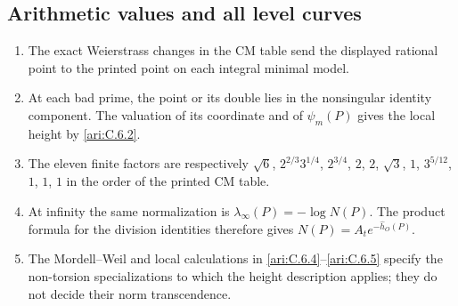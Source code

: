 \subsection{Arithmetic values and all level curves}
\RungOne
\begin{enumerate}[label=\arabic*.]
\item The exact Weierstrass changes in the CM table
send the displayed rational point to the printed
point on each integral minimal model.
\item At each bad prime, the point or its double
lies in the nonsingular identity component. The
valuation of its coordinate and of $\psi_m(P)$ gives
the local height by \ref{ari:C.6.2}.
\item The eleven finite factors are respectively
$\sqrt6$, $2^{2/3}3^{1/4}$, $2^{3/4}$, $2$, $2$,
$\sqrt3$, $1$, $3^{5/12}$, $1$, $1$, $1$ in the
order of the printed CM table.
\item At infinity the same normalization is
$\lambda_\infty(P)=-\log N(P)$.
The product formula for the division identities
therefore gives $N(P)=A_t e^{-\widehat h_O(P)}$.
\item The Mordell--Weil and local calculations in
\ref{ari:C.6.4}--\ref{ari:C.6.5} specify the
non-torsion specializations to which the height
description applies; they do not decide their norm
transcendence.
\end{enumerate}

